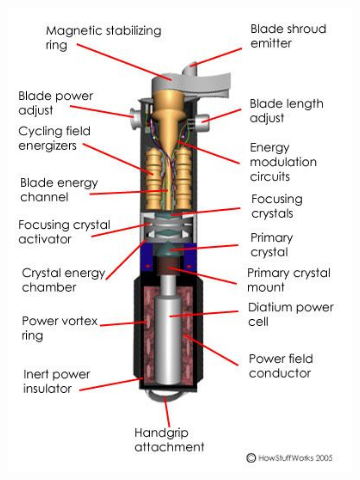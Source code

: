 \documentclass[a4paper, 11pt, normalem]{report}
\begin{document}
\begin{titlepage}
\begin{figure}[H]
\begin{subfigure}[c]{0.42\textwidth}
            \includegraphics[width=\textwidth]{lightmo.jpg}
        \end{subfigure}
    \end{figure}
    \vfill
\end{titlepage}
\tableofcontents
\end{document}

